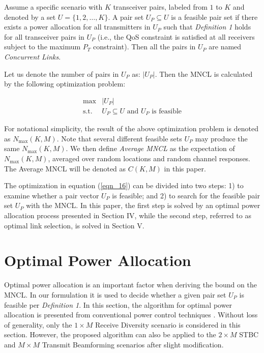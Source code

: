 \documentclass[draftcls,onecolumn,peerview,12pt]{IEEEtran}
\begin{document}
Assume a specific scenario with $K$ transceiver pairs, labeled from
$1$ to $K$ and denoted by a set $U=\{1,2,\ldots,K\}$. A pair set
$U_P \subseteq U$ is a feasible pair set if there exists a power
allocation for all transmitters in $U_P$ such that
\textit{Definition 1} holds for all transceiver pairs in $U_P$
(i.e., the QoS constraint is satisfied at all receivers subject to
the maximum $P_T$ constraint). Then all the pairs in $U_P$ are named
\textit{Concurrent Links}.

Let us denote the number of pairs in $U_P$ as: $|U_P|$. Then the
MNCL is calculated by the following optimization problem:

\begin{eqnarray}
\label{eqn_16} \max& |U_P| \nonumber\\
\textrm{s.t.}& U_P\subseteq U \textrm{ and } U_P \textrm{ is
feasible}
\end{eqnarray}

For notational simplicity, the result of the above optimization
problem is denoted as $N_{\max}(K,M)$. Note that several different
feasible sets $U_P$ may produce the same $N_{\max}(K,M)$. We then
define \textit{Average MNCL} as the expectation of $N_{\max}(K,M)$,
averaged over random locations and random channel responses. The
Average MNCL will be denoted as $C(K,M)$ in this paper.

The optimization in equation (\ref{eqn_16}) can be divided into two
steps: 1) to examine whether a pair vector $U_P$ is feasible; and 2)
to search for the feasible pair set $U_P$ with the MNCL. In this
paper, the first step is solved by an optimal power allocation
process presented in Section IV, while the second step, referred to
as optimal link selection, is solved in Section V.

\section{Optimal Power Allocation}
Optimal power allocation is an important factor when deriving the
bound on the MNCL. In our formulation it is used to decide whether a
given pair set $U_P$ is feasible per \textit{Definition 1}. In this
section, the algorithm for optimal power allocation is presented
from conventional power control techniques
\cite{13_JointOptimal1998, 22_Powercontrol1995,
23_FrameworkUplink1995}. Without loss of generality, only the $1
\times M$ Receive Diversity scenario is considered in this section.
However, the proposed algorithm can also be applied to the $2 \times
M$ STBC and $M \times M$ Transmit Beamforming scenarios after slight
modification.
\end{document}
